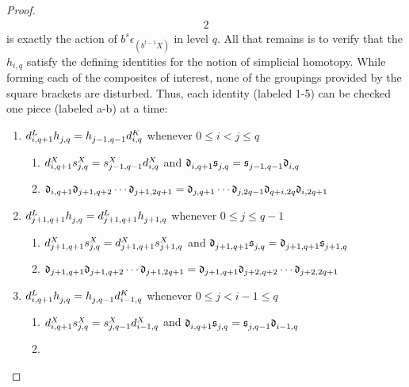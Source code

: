 \documentclass[11pt]{amsart}
\theoremstyle{plain}
\begin{document}
\begin{proof}
\begin{alignat*}{2}
\end{alignat*}
is exactly the action of $b^{s}\epsilon_{(b^{t-1}X)}$ in level $q$.
All that remains is to verify that the $h_{i,q}$ satisfy the defining identities for the notion of simplicial homotopy. While forming each of the composites of interest, none of the groupings provided by the square brackets are disturbed. Thus, each identity (labeled 1-5) can be checked one piece (labeled a-b) at a time:
{\renewcommand{\circ}{\relax}
\begin{enumerate}\squishlist
\setlength{\parindent}{.25in}
\item $\trip{d}{i,q+1}{L}\circ \trip{h}{j,q}{}=\trip{h}{j-1,q-1}{}\circ \trip{d}{i,q}{K}$ whenever $0\leq i<j\leq q$
\begin{enumerate}\squishlist
\setlength{\parindent}{.25in}
\item $\trip{d}{i,q+1}{X}\circ \trip{s}{j,q}{X}=\trip{s}{j-1,q-1}{X}\circ \trip{d}{i,q}{X}$ and $\trip{\frakd}{i,q+1}{}\circ \trip{\fraks}{j,q}{}=\trip{\fraks}{j-1,q-1}{}\circ \trip{\frakd}{i,q}{}$
\item 
$\frakd_{i,q+1}\circ
\frakd_{j+1,q+2}\circ\cdots \circ\frakd_{j+1,2q+1}=
\frakd_{j,q+1}\circ\cdots \circ\frakd_{j,2q-1}\circ
\frakd_{q+i,2q}\circ\frakd_{i,2q+1}$
\end{enumerate}
\item $\trip{d}{j+1,q+1}{L}\circ \trip{h}{j,q}{}=\trip{d}{j+1,q+1}{L}\circ \trip{h}{j+1,q}{}$ whenever $0\leq j\leq q-1$
\begin{enumerate}\squishlist
\setlength{\parindent}{.25in}
\item $\trip{d}{j+1,q+1}{X}\circ \trip{s}{j,q}{X}=\trip{d}{j+1,q+1}{X}\circ \trip{s}{j+1,q}{X}$ and $\trip{\frakd}{j+1,q+1}{}\circ \trip{\fraks}{j,q}{}=\trip{\frakd}{j+1,q+1}{}\circ \trip{\fraks}{j+1,q}{}$
\item 
$\frakd_{j+1,q+1}\circ
\frakd_{j+1,q+2}\circ\cdots \circ\frakd_{j+1,2q+1}=
\frakd_{j+1,q+1}\circ
\frakd_{j+2,q+2}\circ\cdots \circ\frakd_{j+2,2q+1}$
\end{enumerate}
\item $\trip{d}{i,q+1}{L}\circ \trip{h}{j,q}{}=\trip{h}{j,q-1}{}\circ \trip{d}{i-1,q}{K}$ whenever $0\leq j<i-1\leq q$
\begin{enumerate}\squishlist
\setlength{\parindent}{.25in}
\item $\trip{d}{i,q+1}{X}\circ \trip{s}{j,q}{X}=\trip{s}{j,q-1}{X}\circ \trip{d}{i-1,q}{X}$ and $\trip{\frakd}{i,q+1}{}\circ \trip{\fraks}{j,q}{}=\trip{\fraks}{j,q-1}{}\circ \trip{\frakd}{i-1,q}{}$
\item 

\end{enumerate}
\end{enumerate}}
\end{proof}
\end{document}
